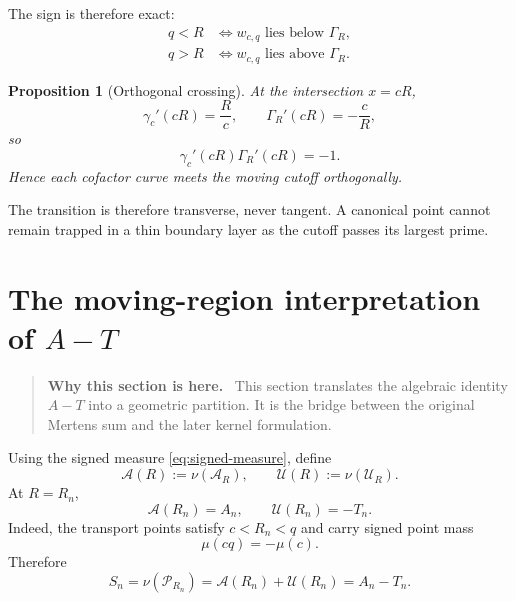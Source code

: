 \documentclass[11pt]{article}
\newtheorem{proposition}[theorem]{Proposition}
\theoremstyle{definition}
\theoremstyle{remark}
\newcommand{\1}{\mathbf{1}}
\newenvironment{motivation}
  {\begin{quote}\small\color{ovvogray}\textbf{Why this section is here.}\ }
  {\end{quote}}
\begin{document}
The sign is therefore exact:
\begin{align}
 q<R&\iff w_{c,q}\text{ lies below }\Gamma_R,
 \label{eq:below}\\
 q>R&\iff w_{c,q}\text{ lies above }\Gamma_R.
 \label{eq:above}
\end{align}

\begin{proposition}[Orthogonal crossing]
\label{prop:orthogonal-crossing}
At the intersection $x=cR$,
\begin{equation}
 \gamma_c'(cR)=\frac{R}{c},
 \qquad
 \Gamma_R'(cR)=-\frac{c}{R},
 \label{eq:orthogonal-slopes}
\end{equation}
so
\begin{equation}
 \gamma_c'(cR)\Gamma_R'(cR)=-1.
 \label{eq:orthogonal-product}
\end{equation}
Hence each cofactor curve meets the moving cutoff orthogonally.
\end{proposition}

The transition is therefore transverse, never tangent.  A canonical point cannot remain trapped in a thin boundary layer as the cutoff passes its largest prime.

\section{The moving-region interpretation of $A-T$}
\label{sec:moving-region-AT}

\begin{motivation}
This section translates the algebraic identity $A-T$ into a geometric partition.  It is the bridge between the original Mertens sum and the later kernel formulation.
\end{motivation}

Using the signed measure \cref{eq:signed-measure}, define
\begin{equation}
 \mathcal A(R):=\nu(\mathscr A_R),
 \qquad
 \mathcal U(R):=\nu(\mathscr U_R).
 \label{eq:AU-measures}
\end{equation}
At $R=R_n$,
\begin{equation}
 \mathcal A(R_n)=A_n,
 \qquad
 \mathcal U(R_n)=-T_n.
 \label{eq:AU-AT}
\end{equation}
Indeed, the transport points satisfy $c<R_n<q$ and carry signed point mass
\[
 \mu(cq)=-\mu(c).
\]
Therefore
\begin{equation}
 \boxed{
 S_n
 =\nu(\mathscr P_{R_n})
 =\mathcal A(R_n)+\mathcal U(R_n)
 =A_n-T_n.
 }
 \label{eq:geometric-AT}
\end{equation}
\end{document}
